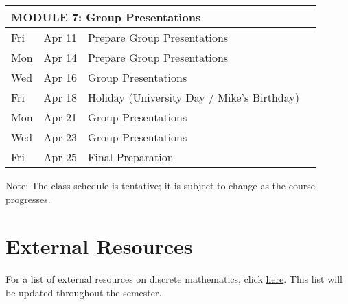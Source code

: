 \documentclass[letterpaper]{inzane_syllabus} %
\begin{document}
\begin{center}
\begin{tabularx}{\textwidth}{p{2cm}p{2cm}p{8cm}p{9.5cm}}
\hline
\multicolumn{4}{l}{\textbf{\textcolor{myCOLOR}{\large MODULE 7: Group Presentations}}} \\
\hline
Fri &  Apr 11 & Prepare Group Presentations & \\
Mon &  Apr 14 & Prepare Group Presentations & \\
Wed &  Apr 16 & Group Presentations & \\
Fri &  Apr 18 & Holiday (University Day / Mike's Birthday) & \\
Mon &  Apr 21 & Group Presentations  & \\
Wed &  Apr 23 & Group Presentations & \\
Fri &  Apr 25 & Final Preparation &\\
%
\hline 
\end{tabularx}
Note: The class schedule is tentative; it is subject to change as the course progresses.
\end{center}

\vspace{1cm}
\section{External Resources}

For a list of external resources on discrete mathematics, click  \href{https://github.com/mikewojnowicz/csci246_spring2025/blob/main/LINKS.md}{here}.  This list will be updated throughout the semester.

\vspace{0.5cm}


\end{document}
